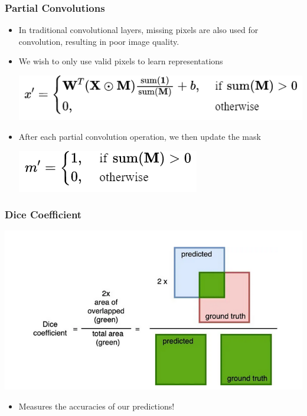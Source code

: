 \documentclass{beamer}
\begin{document}
\begin{frame}
	\frametitle{Partial Convolutions}
	\begin{itemize}
		\item In traditional convolutional layers, missing pixels are also used for convolution, resulting in poor image quality.
		\item We wish to only use valid pixels to learn representations 
		\begin{center}
		\includegraphics[scale=0.5]{partial1.png}
		\end{center}
		\item After each partial convolution operation, we then update the mask
		\begin{center}
			\includegraphics[scale=0.5]{partial2.png}
		\end{center}
	\end{itemize}
	
\end{frame}

\begin{frame}
	\frametitle{Dice Coefficient}
	\begin{center}
		\includegraphics[scale=0.4]{dice.png}
	\end{center}
	\begin{itemize}
		\item Measures the accuracies of our predictions!
	\end{itemize}
\end{frame}
\end{document}
